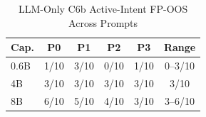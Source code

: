 \begin{table}[!t]
\centering
\caption{LLM-Only C6b Active-Intent FP-OOS Across Prompts}
\label{tab:prompt_c6b}
\scriptsize
\setlength{\tabcolsep}{5pt}
\begin{tabular}{@{}lccccc@{}}
\toprule
Cap. & P0 & P1 & P2 & P3 & Range \\
\midrule
0.6B & 1/10 & 3/10 & 0/10 & 1/10 & 0--3/10 \\
4B & 3/10 & 3/10 & 3/10 & 3/10 & 3/10 \\
8B & 6/10 & 5/10 & 4/10 & 3/10 & 3--6/10 \\
\bottomrule
\end{tabular}
\end{table}
